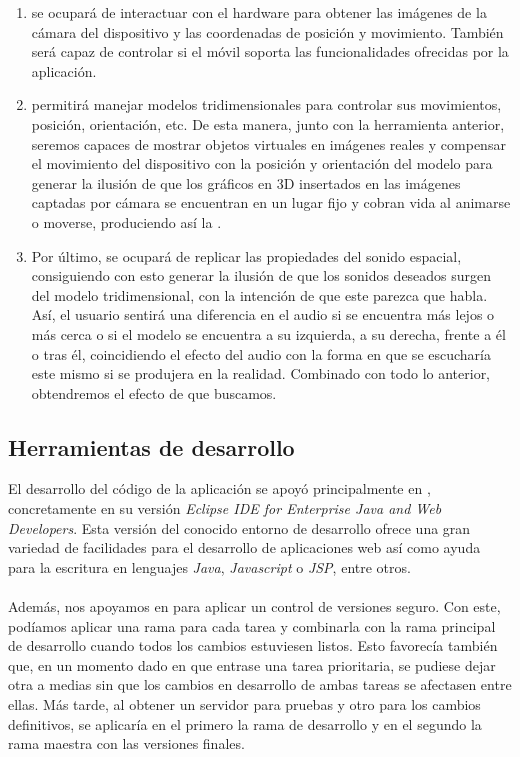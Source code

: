 \documentclass{subfiles}
\begin{document}
        \begin{enumerate}
            \item \webxr se ocupará de interactuar con el hardware para obtener las imágenes de la cámara del dispositivo y las coordenadas de posición y movimiento. También será capaz de controlar si el móvil soporta las funcionalidades ofrecidas por la aplicación.

            \item \threejs permitirá manejar modelos tridimensionales para controlar sus movimientos, posición, orientación, etc. De esta manera, junto con la herramienta anterior, seremos capaces de mostrar objetos virtuales en imágenes reales y compensar el movimiento del dispositivo con la posición y orientación del modelo para generar la ilusión de que los gráficos en 3D insertados en las imágenes captadas por cámara se encuentran en un lugar fijo y cobran vida al animarse o moverse, produciendo así la \ra.

            \item Por último, \resonanceaudio se ocupará de replicar las propiedades del sonido espacial, consiguiendo con esto generar la ilusión de que los sonidos deseados surgen del modelo tridimensional, con la intención de que este parezca que habla. Así, el usuario sentirá una diferencia en el audio si se encuentra más lejos o más cerca o si el modelo se encuentra a su izquierda, a su derecha, frente a él o tras él, coincidiendo el efecto del audio con la forma en que se escucharía este mismo si se produjera en la realidad. Combinado con todo lo anterior, obtendremos el efecto de \ra que buscamos.
        \end{enumerate}

        \subsection{Herramientas de desarrollo}
        \label{sec:herramientas_de_desarrollo}

        El desarrollo del código de la aplicación se apoyó principalmente en \eclipse \cite{web:eclipse}, concretamente en su versión \textit{Eclipse IDE for Enterprise Java and Web Developers}. Esta versión del conocido entorno de desarrollo ofrece una gran variedad de facilidades para el desarrollo de aplicaciones web así como ayuda para la escritura en lenguajes \textit{Java}, \textit{Javascript} o \textit{JSP}, entre otros.

        \paragraph{}
        Además, nos apoyamos en \github \cite{web:github} para aplicar un control de versiones seguro. Con este, podíamos aplicar una rama para cada tarea y combinarla con la rama principal de desarrollo cuando todos los cambios estuviesen listos. Esto favorecía también que, en un momento dado en que entrase una tarea prioritaria, se pudiese dejar otra a medias sin que los cambios en desarrollo de ambas tareas se afectasen entre ellas. Más tarde, al obtener un servidor para pruebas y otro para los cambios definitivos, se aplicaría en el primero la rama de desarrollo y en el segundo la rama maestra con las versiones finales.
\end{document}
